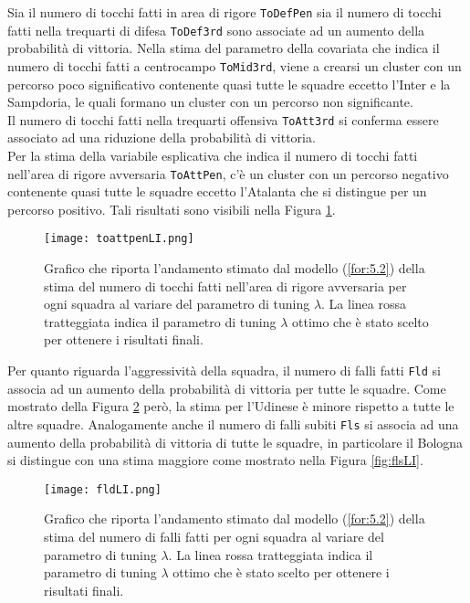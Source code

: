 Sia il numero di tocchi fatti in area di rigore \texttt{ToDefPen} sia il numero di tocchi fatti nella trequarti di difesa \texttt{ToDef3rd} sono associate ad un aumento della probabilità di vittoria. Nella stima del parametro della covariata che indica il numero di tocchi fatti a centrocampo \texttt{ToMid3rd}, viene a crearsi un cluster con un percorso poco significativo contenente quasi tutte le squadre eccetto l'Inter e la Sampdoria, le quali formano un cluster con un percorso non significante.\\
Il numero di tocchi fatti nella trequarti offensiva \texttt{ToAtt3rd} si conferma essere associato ad una riduzione della probabilità di vittoria.\\
Per la stima della variabile esplicativa che indica il numero di tocchi fatti nell'area di rigore avversaria \texttt{ToAttPen}, c'è un cluster con un percorso negativo contenente quasi tutte le squadre eccetto l'Atalanta che si distingue per un percorso positivo. Tali risultati sono visibili nella Figura \ref{fig:toattpenLI}.
\begin{figure}[htbp]
	\begin{center}
		\texttt{[image: toattpenLI.png]}
		\caption{Grafico che riporta l'andamento stimato dal modello (\ref{for:5.2}) della stima del numero di tocchi fatti nell'area di rigore avversaria per ogni squadra al variare del parametro di tuning $\lambda$. La linea rossa tratteggiata indica il parametro di tuning $\lambda$ ottimo che è stato scelto per ottenere i risultati finali.} \label{fig:toattpenLI}
	\end{center}
\end{figure}
Per quanto riguarda l'aggressività della squadra, il numero di falli fatti \texttt{Fld} si associa ad un aumento della probabilità di vittoria per tutte le squadre. Come mostrato della Figura \ref{fig:fldLI} però, la stima per l'Udinese è minore rispetto a tutte le altre squadre. Analogamente anche il numero di falli subiti \texttt{Fls} si associa ad una aumento della probabilità di vittoria di tutte le squadre, in particolare il Bologna si distingue con una stima maggiore come mostrato nella Figura \ref{fig:flsLI}.
\begin{figure}[]
	\begin{center}
		\texttt{[image: fldLI.png]}
		\caption{Grafico che riporta l'andamento stimato dal modello (\ref{for:5.2}) della stima del numero di falli fatti per ogni squadra al variare del parametro di tuning $\lambda$. La linea rossa tratteggiata indica il parametro di tuning $\lambda$ ottimo che è stato scelto per ottenere i risultati finali.} \label{fig:fldLI}
	\end{center}
\end{figure}
